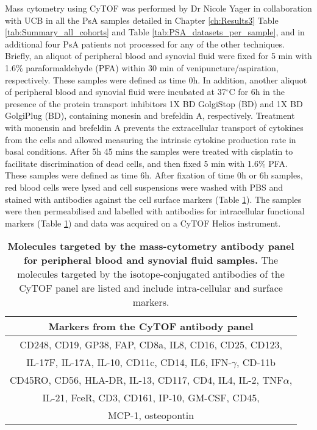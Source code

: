 Mass cytometry using CyTOF was performed by Dr Nicole Yager in collaboration with UCB in all the PsA samples detailed in Chapter \ref{ch:Results3} Table \ref{tab:Summary_all_cohorts} and Table \ref{tab:PSA_datasets_per_sample}, and in additional four PsA patients not processed for any of the other techniques. Briefly, an aliquot of peripheral blood and synovial fluid were fixed for 5 min with 1.6\% paraformaldehyde (PFA) within 30 min of venipuncture/aspiration, respectively. These samples were defined as time 0h. In addition, another aliquot of peripheral blood and synovial fluid were incubated at 37{$^\circ$}C for 6h in the presence of the protein transport inhibitors 1X BD GolgiStop (BD) and 1X BD GolgiPlug (BD), containing monesin and brefeldin A, respectively. Treatment with monensin and brefeldin A prevents the extracellular transport of cytokines from the cells and allowed measuring the intrinsic cytokine production rate in basal conditions. After 5h 45 mins the samples were treated with cisplatin to facilitate discrimination of dead cells, and then fixed 5 min with 1.6\% PFA. These samples were defined as time 6h. After fixation of time 0h or 6h samples, red blood cells were lysed and cell suspensions were washed with PBS and stained with antibodies against the cell surface markers (Table \ref{tab:CyTOF}). The samples were then permeabilised and labelled with antibodies for intracellular functional markers (Table \ref{tab:CyTOF}) and data was acquired on a CyTOF Helios instrument. 



\begin{table}[H]
\centering
\setlength{\tabcolsep}{20pt}
\renewcommand{\arraystretch}{0.8}
\begin{tabular}{@{} c}
\toprule
\textbf{Markers from the CyTOF antibody panel} \\
\midrule
\midrule
CD248, CD19, GP38, FAP, CD8a, IL8, CD16, CD25, CD123,\\
IL-17F, IL-17A, IL-10, CD11c, CD14, IL6, IFN-$\gamma$, CD-11b\\
CD45RO, CD56, HLA-DR, IL-13, CD117, CD4, IL4, IL-2, TNF$\alpha$,\\
IL-21, FceR, CD3, CD161, IP-10, GM-CSF, CD45, \\
MCP-1, osteopontin\\ 
\bottomrule
\end{tabular}
\medskip %
\caption[Molecules targeted by the mass-cytometry antibody panel for peripheral blood and synovial fluid samples.]{\textbf{Molecules targeted by the mass-cytometry antibody panel for peripheral blood and synovial fluid samples.} The molecules targeted by the isotope-conjugated antibodies of the CyTOF panel are listed and include intra-cellular and surface markers.}
\label{tab:CyTOF}
\end{table}
\bigskip %




